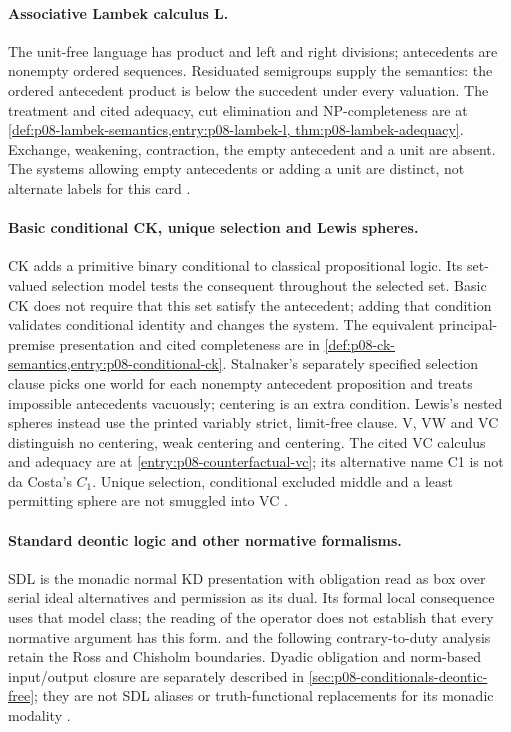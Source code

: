 \paragraph{Associative Lambek calculus L.}
\label{entry:p14-directory-lambek}
The unit-free language has product and left and right divisions;
antecedents are nonempty ordered sequences. Residuated semigroups supply
the semantics: the ordered antecedent product is below the succedent
under every valuation. The treatment and cited adequacy, cut elimination
and NP-completeness are at
\cref{def:p08-lambek-semantics,entry:p08-lambek-l,
thm:p08-lambek-adequacy}. Exchange, weakening, contraction, the empty
antecedent and a unit are absent. The systems allowing empty antecedents
or adding a unit are distinct, not alternate labels for this card
\cite{Lambek1958,Buszkowski2010,Pentus2006}.

\paragraph{Basic conditional CK, unique selection and Lewis spheres.}
\label{entry:p14-directory-conditionals}
CK adds a primitive binary conditional to classical propositional logic.
Its set-valued selection model tests the consequent throughout the
selected set. Basic CK does not require that this set satisfy the
antecedent; adding that condition validates conditional identity and
changes the system. The equivalent principal-premise presentation and
cited completeness are in
\cref{def:p08-ck-semantics,entry:p08-conditional-ck}.
Stalnaker's separately specified selection clause picks one world for
each nonempty antecedent proposition and treats impossible antecedents
vacuously; centering is an extra condition. Lewis's nested spheres instead
use the printed variably strict, limit-free clause. V, VW and VC distinguish
no centering, weak centering and centering. The cited VC calculus and
adequacy are at \cref{entry:p08-counterfactual-vc}; its alternative name
C1 is not da Costa's \(C_1\). Unique selection, conditional excluded
middle and a least permitting sphere are not smuggled into VC
\cite{Chellas1975,Stalnaker1968,Lewis1971,Lewis1973,Nute1980,Wen2019}.

\paragraph{Standard deontic logic and other normative formalisms.}
\label{entry:p14-directory-deontic}
SDL is the monadic normal KD presentation with obligation read as box
over serial ideal alternatives and permission as its dual. Its formal
local consequence uses that model class; the reading of the operator
does not establish that every normative argument has this form.
 and the following contrary-to-duty analysis retain
the Ross and Chisholm boundaries. Dyadic obligation and norm-based
input/output closure are separately described in
\cref{sec:p08-conditionals-deontic-free}; they are not SDL aliases or
truth-functional replacements for its monadic modality
\cite{VonWright1951,Chisholm1963,Hansson1969,McNamara2006}.

